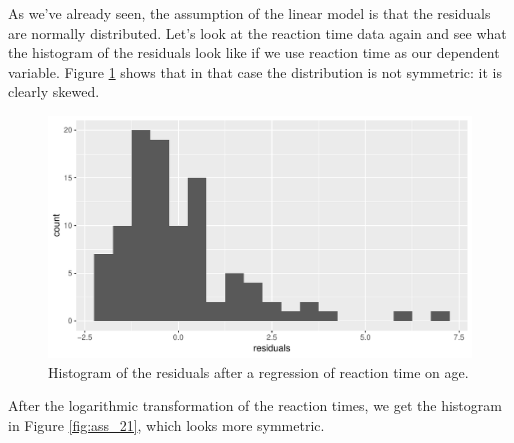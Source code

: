 \documentclass[]{book}\usepackage[]{graphicx}\usepackage[]{color}
\makeatletter
\def\maxwidth{ %
  \ifdim\Gin@nat@width>\linewidth
    \linewidth
  \else
    \Gin@nat@width
  \fi
}
\newenvironment{knitrout}{}{} %
\makeatother
\begin{document}
As we've already seen, the assumption of the linear model is that the residuals are normally distributed. Let's look at the reaction time data again and see what the histogram of the residuals look like if we use reaction time as our dependent variable. Figure \ref{fig:ass_20} shows that in that case the distribution is not symmetric: it is clearly skewed. 

\begin{knitrout}
\color{fgcolor}\begin{figure}

{\centering \includegraphics[width=\maxwidth]{figure/ass_20-1} 

}

\caption[Histogram of the residuals after a regression of reaction time on age]{Histogram of the residuals after a regression of reaction time on age.}\label{fig:ass_20}
\end{figure}


\end{knitrout}

After the logarithmic transformation of the reaction times, we get the histogram in Figure \ref{fig:ass_21}, which looks more symmetric. 
\end{document}

